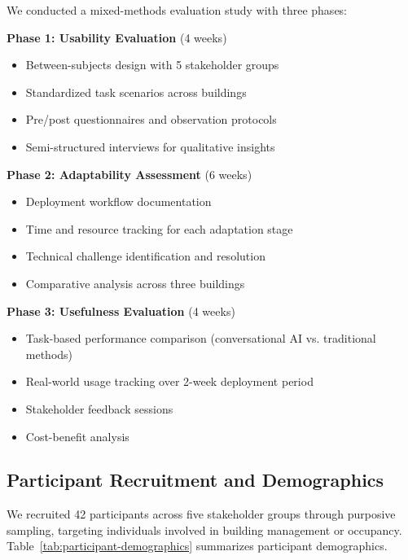 \documentclass[acmlarge]{acmart}
\begin{document}
We conducted a mixed-methods evaluation study with three phases:

\textbf{Phase 1: Usability Evaluation} (4 weeks)
\begin{itemize}
    \item Between-subjects design with 5 stakeholder groups
    \item Standardized task scenarios across buildings
    \item Pre/post questionnaires and observation protocols
    \item Semi-structured interviews for qualitative insights
\end{itemize}

\textbf{Phase 2: Adaptability Assessment} (6 weeks)
\begin{itemize}
    \item Deployment workflow documentation
    \item Time and resource tracking for each adaptation stage
    \item Technical challenge identification and resolution
    \item Comparative analysis across three buildings
\end{itemize}

\textbf{Phase 3: Usefulness Evaluation} (4 weeks)
\begin{itemize}
    \item Task-based performance comparison (conversational AI vs. traditional methods)
    \item Real-world usage tracking over 2-week deployment period
    \item Stakeholder feedback sessions
    \item Cost-benefit analysis
\end{itemize}

\subsection{Participant Recruitment and Demographics}

We recruited 42 participants across five stakeholder groups through purposive sampling, targeting individuals involved in building management or occupancy. Table~\ref{tab:participant-demographics} summarizes participant demographics.
\end{document}
